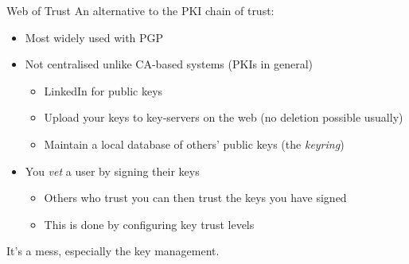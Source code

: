\begin{frame}{Web of Trust}
  An alternative to the PKI chain of trust:
  \begin{itemize}[<+(1)->]
    \item Most widely used with PGP
    \item Not centralised unlike CA-based systems (PKIs in general)
    \begin{itemize}
      \item LinkedIn for public keys
      \item Upload your keys to key-servers on the web (no deletion possible usually)
      \item Maintain a local database of others' public keys (the \emph{keyring})
    \end{itemize}
    \item You \emph{vet} a user by signing their keys
    \begin{itemize}
      \item Others who trust you can then trust the keys you have signed
      \item This is done by configuring key trust levels
    \end{itemize}
  \end{itemize}

  \pause
  It's a mess, especially the key management.
\end{frame}


